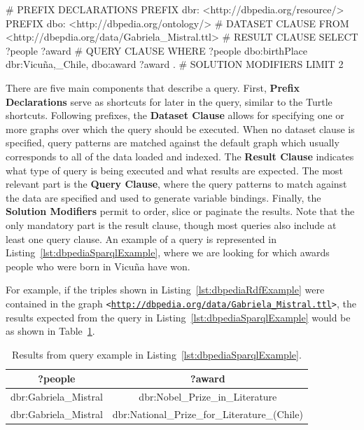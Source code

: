 \begin{sparqlcode}[%
    caption={\SPARQL{} query for getting awards won by people who were born in Vicuña.},
    label={lst:dbpediaSparqlExample}]
# PREFIX DECLARATIONS
PREFIX dbr: <http://dbpedia.org/resource/>
PREFIX dbo: <http://dbpedia.org/ontology/>
# DATASET CLAUSE
FROM <http://dbepdia.org/data/Gabriela_Mistral.ttl>
# RESULT CLAUSE
SELECT ?people ?award
# QUERY CLAUSE
WHERE {
    ?people dbo:birthPlace dbr:Vicuña,_Chile,
        dbo:award ?award .
}
# SOLUTION MODIFIERS
LIMIT 2
\end{sparqlcode}

There are five main components that describe a \SPARQL{} query. First, \textbf{Prefix Declarations} 
serve as shortcuts for later in the query, similar to the Turtle shortcuts. Following prefixes, 
the \textbf{Dataset Clause} allows for specifying one or more \RDF{} graphs over which the query 
should be executed. When no dataset clause is specified, query patterns are matched against the 
default graph which usually corresponds to all of the data loaded and indexed. The 
\textbf{Result Clause} indicates what type of query is being executed and what results are expected. 
The most relevant part is the \textbf{Query Clause}, where the query patterns to match against the 
data are specified and used to generate variable bindings. Finally, the \textbf{Solution Modifiers} 
permit to order, slice or paginate the results. Note that the only mandatory part is the result 
clause, though most queries also include at least one query clause. An example of a \SPARQL{} query is 
represented in Listing~\ref{lst:dbpediaSparqlExample}, where we are looking for which awards 
people who were born in Vicuña have won.

For example, if the \RDF{} triples shown in Listing~\ref{lst:dbpediaRdfExample} were contained in the 
\RDF{} graph \texttt{<\url{http://dbpedia.org/data/Gabriela\_Mistral.ttl}>}, the results 
expected from the \SPARQL{} query in Listing~\ref{lst:dbpediaSparqlExample} would be as shown 
in Table~\ref{table:dbpediaExampleResults}.

\begin{table}[h!]
    \centering
    \begin{tabular}{ |c|c| }        
        \hline
        ?people & ?award \\ 
        \hline
        dbr:Gabriela\_Mistral & dbr:Nobel\_Prize\_in\_Literature \\
        dbr:Gabriela\_Mistral & dbr:National\_Prize\_for\_Literature\_(Chile) \\
        \hline
    \end{tabular}
    \caption{Results from \SPARQL{} query example in Listing~\ref{lst:dbpediaSparqlExample}.}
    \label{table:dbpediaExampleResults}
\end{table}

